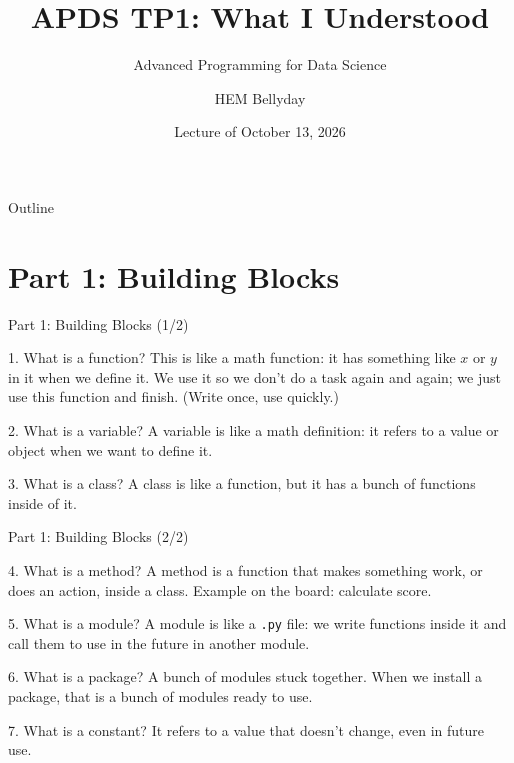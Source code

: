 \documentclass[aspectratio=169,11pt]{beamer}
\title[APDS TP1 Summary]{APDS TP1: What I Understood}
\subtitle{Advanced Programming for Data Science}
\author[HEM Bellyday]{HEM Bellyday}
\institute[ITC]{Department of Applied Mathematics and Statistics (AMS)\\
Institute of Technology of Cambodia (ITC)\\[2pt]
Lecturer: Mr.~VANN Visal}
\date{Lecture of October 13, 2026}
\begin{document}
\begin{frame}
  \titlepage
\end{frame}

\begin{frame}{Outline}
  \tableofcontents
\end{frame}

\section{Part 1: Building Blocks}

\begin{frame}{Part 1: Building Blocks (1/2)}
  \begin{block}{1. What is a function?}
    This is like a math function: it has something like $x$ or $y$ in it when we
    define it. We use it so we don't do a task again and again; we just use this
    function and finish. (Write once, use quickly.)
  \end{block}
  \begin{block}{2. What is a variable?}
    A variable is like a math definition: it refers to a value or object when we
    want to define it.
  \end{block}
  \begin{block}{3. What is a class?}
    A class is like a function, but it has a bunch of functions inside of it.
  \end{block}
\end{frame}

\begin{frame}{Part 1: Building Blocks (2/2)}
  \begin{block}{4. What is a method?}
    A method is a function that makes something work, or does an action, inside a
    class. Example on the board: calculate score.
  \end{block}
  \begin{block}{5. What is a module?}
    A module is like a \texttt{.py} file: we write functions inside it and call
    them to use in the future in another module.
  \end{block}
  \begin{block}{6. What is a package?}
    A bunch of modules stuck together. When we install a package, that is a bunch
    of modules ready to use.
  \end{block}
  \begin{block}{7. What is a constant?}
    It refers to a value that doesn't change, even in future use.
  \end{block}
\end{frame}
\end{document}
